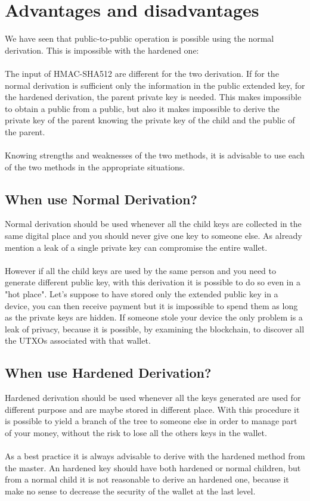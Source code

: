 \section{Advantages and disadvantages}
We have seen that public-to-public operation is possible using the normal derivation. This is impossible with the hardened one: \\ \\
The input of HMAC-SHA512 are different for the two derivation. If for the normal derivation is sufficient only the information in the public extended key, for the hardened derivation, the parent private key is needed. This makes impossible to obtain a public from a public, but also it makes impossible to derive the private key of the parent knowing the private key of the child and the public of the parent.
\\ \\
Knowing strengths and weaknesses of the two methods, it is advisable to use each of the two methods in the appropriate situations.

\subsection{When use Normal Derivation?}
Normal derivation should be used whenever all the child keys are collected in the same digital place and you should never give one key to someone else. As already mention a leak of a single private key can compromise the entire wallet.
\\ \\
However if all the child keys are used by the same person and you need to generate different public key, with this derivation it is possible to do so even in a "hot place". Let's suppose to have stored only the extended public key in a device, you can then receive payment but it is impossible to spend them as long as the private keys are hidden. If someone stole your device the only problem is a leak of privacy, because it is possible, by examining the blockchain, to discover all the UTXOs associated with that wallet.


\subsection{When use Hardened Derivation?}
Hardened derivation should be used whenever all the keys generated are used for different purpose and are maybe stored in different place. With this procedure it is possible to yield a branch of the tree to someone else in order to manage part of your money, without the risk to lose all the others keys in the wallet.
\\ \\
As a best practice it is always advisable to derive with the hardened method from the master. An hardened key should have both hardened or normal children, but from a normal child it is not reasonable to derive an hardened one, because it make no sense to decrease the security of the wallet at the last level.


